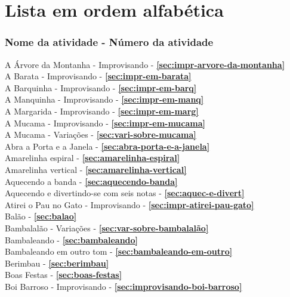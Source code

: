 
\section*{Lista em ordem alfabética}

\subsubsection*{Nome da atividade - Número da atividade}

A Árvore da Montanha  - Improvisando - \textbf{\ref{sec:impr-arvore-da-montanha}}  \\
A Barata - Improvisando - \textbf{\ref{sec:impr-em-barata}} \\
A Barquinha - Improvisando - \textbf{\ref{sec:impr-em-barq}} \\
A Manquinha - Improvisando - \textbf{\ref{sec:impr-em-manq}} \\
A Margarida - Improvisando - \textbf{\ref{sec:impr-em-marg}} \\
A Mucama - Improvisando - \textbf{\ref{sec:impr-em-mucama}} \\
A Mucama - Variações - \textbf{\ref{sec:vari-sobre-mucama}} \\
Abra a Porta e a Janela - \textbf{\ref{sec:abra-porta-e-a-janela}} \\
Amarelinha espiral - \textbf{\ref{sec:amarelinha-espiral}} \\
Amarelinha vertical - \textbf{\ref{sec:amarelinha-vertical}} \\
Aquecendo a banda - \textbf{\ref{sec:aquecendo-banda}} \\
Aquecendo e divertindo-se com seis notas - \textbf{\ref{sec:aquec-e-divert}} \\
Atirei o Pau no Gato - Improvisando - \textbf{\ref{sec:impr-atirei-pau-gato}} \\
Balão - \textbf{\ref{sec:balao}} \\
Bambalalão - Variações - \textbf{\ref{sec:var-sobre-bambalalão}} \\
Bambaleando - \textbf{\ref{sec:bambaleando}} \\
Bambaleando em outro tom - \textbf{\ref{sec:bambaleando-em-outro}} \\
Berimbau - \textbf{\ref{sec:berimbau}} \\
Boas Festas - \textbf{\ref{sec:boas-festas}} \\
Boi Barroso - Improvisando - \textbf{\ref{sec:improvisando-boi-barroso}} \\
